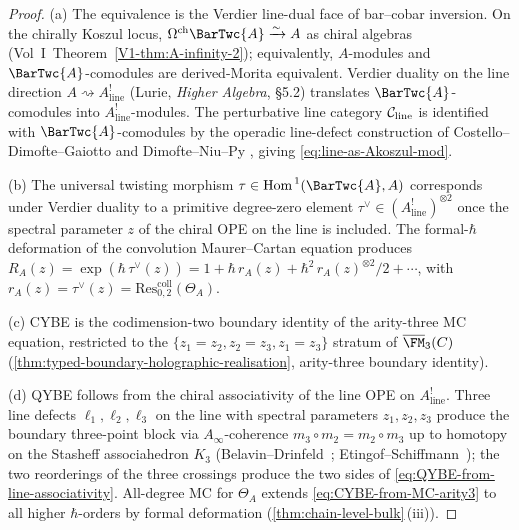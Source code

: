 \begin{proof}
\textup{(a)} The equivalence is the Verdier line-dual face of bar--cobar
inversion. On the chirally Koszul locus,
$\Omega^{\mathrm{ch}}\BarTwc{A} \xrightarrow{\sim} A$ as chiral
algebras (Vol~I~Theorem~\ref*{V1-thm:A-infinity-2}); equivalently,
$A$-modules and $\BarTwc{A}$-comodules are derived-Morita equivalent.
Verdier duality on the line direction
$A \rightsquigarrow A^{!}_{\mathrm{line}}$
\textup(Lurie, \emph{Higher Algebra}, \S 5.2\textup) translates
$\BarTwc{A}$-comodules into $A^{!}_{\mathrm{line}}$-modules.
The perturbative line category $\mathcal C_{\mathrm{line}}$ is identified
with $\BarTwc{A}$-comodules by the operadic line-defect construction
of Costello--Dimofte--Gaiotto \cite{CDG20} and Dimofte--Niu--Py
\cite{DNP25}, giving \eqref{eq:line-as-Akoszul-mod}.

\textup{(b)} The universal twisting morphism
$\tau \in \mathrm{Hom}^{\,1}(\BarTwc{A}, A)$ corresponds under Verdier
duality to a primitive degree-zero element
$\tau^{\vee} \in (A^{!}_{\mathrm{line}})^{\otimes 2}$ once the spectral
parameter $z$ of the chiral OPE on the line is included. The
formal-$\hbar$ deformation of the convolution Maurer--Cartan
equation produces
$R_{A}(z) = \exp(\hbar\,\tau^{\vee}(z)) = 1 + \hbar\,r_{A}(z) +
\hbar^{2}\,r_{A}(z)^{\otimes 2}/2 + \cdots$,
with $r_{A}(z) = \tau^{\vee}(z) = \mathrm{Res}^{\mathrm{coll}}_{0,2}(\Theta_{A})$.

\textup{(c)} CYBE is the codimension-two boundary identity of the
arity-three MC equation, restricted to the
$\{z_{1} = z_{2}, z_{2} = z_{3}, z_{1} = z_{3}\}$ stratum of
$\overline{\FM}_{3}(C)$
(\cref{thm:typed-boundary-holographic-realisation}, arity-three
boundary identity).

\textup{(d)} QYBE follows from the chiral associativity of the line
OPE on $A^{!}_{\mathrm{line}}$.  Three line defects $\ell_{1},
\ell_{2}, \ell_{3}$ on the line with spectral parameters
$z_{1}, z_{2}, z_{3}$ produce the boundary three-point block via
$A_{\infty}$-coherence $m_{3}\circ m_{2} = m_{2}\circ m_{3}$ up to
homotopy on the Stasheff associahedron $K_{3}$
(Belavin--Drinfeld~\cite{BelavinDrinfeld}; Etingof--Schiffmann~\cite{ES98}); the
two reorderings of the three crossings produce the two sides of
\eqref{eq:QYBE-from-line-associativity}.  All-degree MC for
$\Theta_{A}$ extends \eqref{eq:CYBE-from-MC-arity3} to all higher
$\hbar$-orders by formal deformation
(\cref{thm:chain-level-bulk}\,(iii)).
\end{proof}


